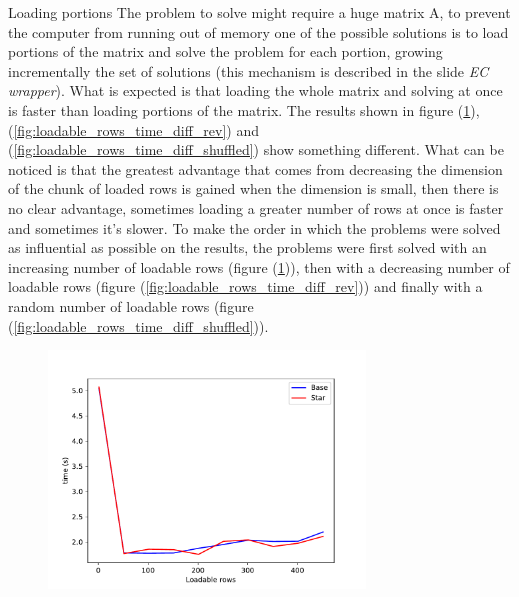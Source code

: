 \documentclass{beamer}
\begin{document}
\begin{frame}{Loading portions}
    The problem to solve might require a huge matrix A,
    to prevent the computer from running out of memory
    one of the possible solutions is to load portions of the matrix
    and solve the problem for each portion, growing incrementally
    the set of solutions (this mechanism is described in the slide \textit{EC wrapper}).
    What is expected is that loading the whole matrix and solving
    at once is faster than loading portions of the matrix.
    The results shown in figure (\ref{fig:loadable_rows_time_diff}), 
    (\ref{fig:loadable_rows_time_diff_rev}) and (\ref{fig:loadable_rows_time_diff_shuffled})
    show something different.
    What can be noticed is that the greatest advantage that comes
    from decreasing the dimension of the chunk of loaded rows is gained
    when the dimension is small, then there is no clear advantage,
    sometimes loading a greater number of rows at once is faster
    and sometimes it's slower.
    To make the order in which the problems were solved as influential as possible 
    on the results, the problems were first solved with an increasing number of loadable rows (figure (\ref{fig:loadable_rows_time_diff})),
    then with a decreasing number of loadable rows (figure (\ref{fig:loadable_rows_time_diff_rev})) and finally with a random number of loadable rows
    (figure (\ref{fig:loadable_rows_time_diff_shuffled})).
\end{frame}

\begin{frame}
    \begin{figure}
        \centering
        \includegraphics[width=0.75\textwidth]{loadable_rows_time_diff.pdf}
        \label{fig:loadable_rows_time_diff}
    \end{figure}
\end{frame}
\end{document}
